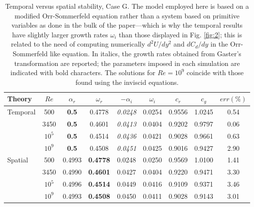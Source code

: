 \begin{table}[H]
	\begin{center}
		\begin{tabular}{l|c|c|c|c|c|c|c|c}
			\hline 
			\hline
			Theory & $Re$ & $\alpha_r$ & $\omega_r$ & $-\alpha_i$ & $\omega_i$ & $c_r$ & $c_g$ & $err(\%)$ \\ 
			\hline 
			Temporal & 500 &\textbf{ 0.5}  & 0.4778 & \textit{0.0248} & 0.0254 & 0.9556 & 1.0245 & 0.54 \\ 
			
			& 3450 & \textbf{0.5}  & 0.4601 &\textit{ 0.0413} & 0.0404 & 0.9202 & 0.9797 & 0.06 \\ 
			
			& $10^5$ & \textbf{0.5 } & 0.4514 & \textit{0.0436} & 0.0421 & 0.9028 & 0.9661 & 0.63 \\ 
			
			& $10^9$ &\textbf{ 0.5}  & 0.4508 & \textit{0.0451} & 0.0425 & 0.9016 & 0.9427 & 2.90 \\ 
			
			Spatial & 500 & 0.4993 & \textbf{0.4778} & 0.0248 & 0.0250 & 0.9569 & 1.0100 & 1.41 \\ 
			
			& 3450 & 0.4990 & \textbf{0.4601} & 0.0427 & 0.0404 & 0.9220 & 0.9471  & 3.30 \\ 
			
			& $10^5$ & 0.4996 & \textbf{0.4514} & 0.0449 &  0.0416 & 0.9109 & 0.9371 & 3.46 \\ 
			
			& $10^9$ & 0.4993 & \textbf{0.4508} & 0.0450 & 0.0411 & 0.9028 & 0.9143 & 3.01 \\ 
			\hline 
			\hline
		\end{tabular} 
	\end{center}
	\label{tab:spa_tem}
	\caption{Temporal versus spatial stability, Case G. The model employed
		here is based on a modified Orr-Sommerfeld equation rather than a system
		based on primitive variables as done in the bulk of the paper—which is
		why the temporal results have slightly larger growth rates $\omega_i$ than those
		displayed in Fig. \ref{fig:2}; this is related to the need of computing numerically
		$d^2 U /dy^2$ and $dC_d /dy$ in the Orr-Sommerfeld like equation. In italics,
		the growth rates obtained from Gaster’s transformation are reported; the
		parameters imposed in each simulation are indicated with bold characters.
		The solutions for $Re = 10^9$ coincide with those found using the inviscid
		equations.}
\end{table}

